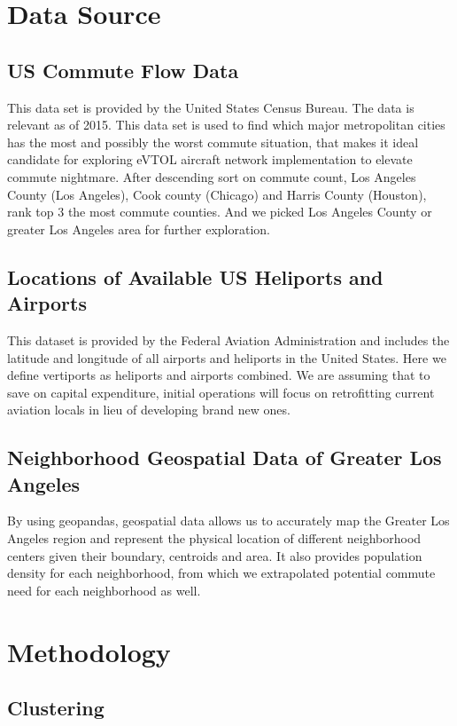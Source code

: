 \documentclass{article}
\begin{document}
\section{Data Source}

\subsection{US Commute Flow Data}
This data set is provided by the United States Census Bureau. The data is relevant as of 2015. This data set is used to find which major metropolitan cities has the most and possibly the worst commute situation, that makes it ideal candidate for exploring eVTOL aircraft network implementation to elevate commute nightmare. After descending sort on commute count, Los Angeles County (Los Angeles), Cook county (Chicago) and Harris County (Houston), rank top 3 the most commute counties. And we picked Los Angeles County or greater Los Angeles area for further exploration.

\subsection{Locations of Available US Heliports and Airports}
This dataset is provided by the Federal Aviation Administration and includes the latitude and longitude of all airports and heliports in the United States. Here we define vertiports as heliports and airports combined. We are assuming that to save on capital expenditure, initial operations will focus on retrofitting current aviation locals in lieu of developing brand new ones.

\subsection{Neighborhood Geospatial Data of Greater Los Angeles}
By using geopandas, geospatial data allows us to accurately map the Greater Los Angeles region and represent the physical location of different neighborhood centers given their boundary, centroids and area. It also provides population density for each neighborhood, from which we extrapolated potential commute need for each neighborhood as well.

\section{Methodology}
\subsection{Clustering}
\end{document}
